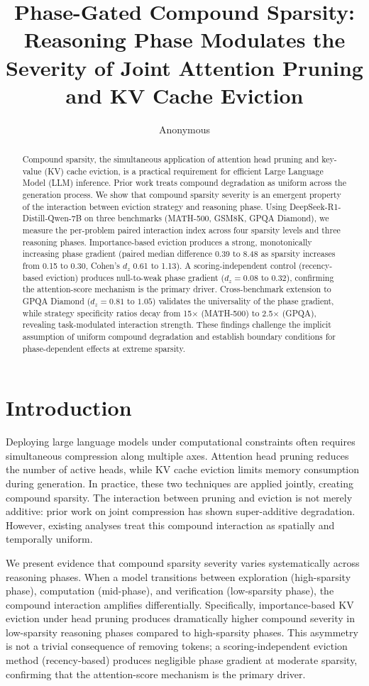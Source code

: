 \documentclass[11pt,a4paper]{article}
\title{Phase-Gated Compound Sparsity: Reasoning Phase Modulates the Severity of Joint Attention Pruning and KV Cache Eviction}
\author{Anonymous}
\date{}
\begin{document}
\maketitle

\begin{abstract}
Compound sparsity, the simultaneous application of attention head pruning and key-value (KV) cache eviction, is a practical requirement for efficient Large Language Model (LLM) inference. Prior work treats compound degradation as uniform across the generation process. We show that compound sparsity severity is an emergent property of the interaction between eviction strategy and reasoning phase. Using DeepSeek-R1-Distill-Qwen-7B on three benchmarks (MATH-500, GSM8K, GPQA Diamond), we measure the per-problem paired interaction index across four sparsity levels and three reasoning phases. Importance-based eviction produces a strong, monotonically increasing phase gradient (paired median difference 0.39 to 8.48 as sparsity increases from 0.15 to 0.30, Cohen's $d_z$ 0.61 to 1.13). A scoring-independent control (recency-based eviction) produces null-to-weak phase gradient ($d_z=0.08$ to $0.32$), confirming the attention-score mechanism is the primary driver. Cross-benchmark extension to GPQA Diamond ($d_z=0.81$ to $1.05$) validates the universality of the phase gradient, while strategy specificity ratios decay from 15$\times$ (MATH-500) to 2.5$\times$ (GPQA), revealing task-modulated interaction strength. These findings challenge the implicit assumption of uniform compound degradation and establish boundary conditions for phase-dependent effects at extreme sparsity.
\end{abstract}

\section{Introduction}

Deploying large language models under computational constraints often requires simultaneous compression along multiple axes. Attention head pruning reduces the number of active heads, while KV cache eviction limits memory consumption during generation. In practice, these two techniques are applied jointly, creating compound sparsity. The interaction between pruning and eviction is not merely additive: prior work on joint compression has shown super-additive degradation. However, existing analyses treat this compound interaction as spatially and temporally uniform.

We present evidence that compound sparsity severity varies systematically across reasoning phases. When a model transitions between exploration (high-sparsity phase), computation (mid-phase), and verification (low-sparsity phase), the compound interaction amplifies differentially. Specifically, importance-based KV eviction under head pruning produces dramatically higher compound severity in low-sparsity reasoning phases compared to high-sparsity phases. This asymmetry is not a trivial consequence of removing tokens; a scoring-independent eviction method (recency-based) produces negligible phase gradient at moderate sparsity, confirming that the attention-score mechanism is the primary driver.
\end{document}
